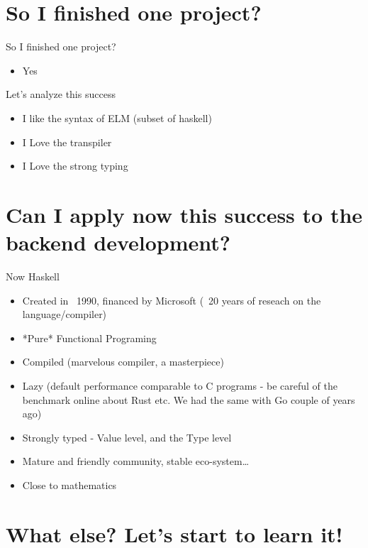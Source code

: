 \documentclass[10pt]{beamer}
\begin{document}
\section{So I finished one project?}

\begin{frame}{So I finished one project?}
\begin{itemize}
\item Yes
\end{itemize}
\end{frame}

\begin{frame}{Let's analyze this success}
\begin{itemize}
\item I like the syntax of ELM (subset of haskell)
\item I Love the transpiler
\item I Love the strong typing
\end{itemize}
\end{frame}

\section{Can I apply now this success to the backend development?}

\begin{frame}{Now Haskell}
\begin{itemize}
\item Created in ~1990, financed by Microsoft (~20 years of reseach on the language/compiler)
\item *Pure* Functional Programing
\item Compiled (marvelous compiler, a masterpiece)
\item Lazy (default performance comparable to C programs - be careful of the benchmark online about Rust etc. We had the same with Go couple of years ago)
\item Strongly typed - Value level, and the Type level
\item Mature and friendly community, stable eco-system…
\item Close to mathematics
\end{itemize}
\end{frame}

\section{What else? Let's start to learn it!}
\end{document}

